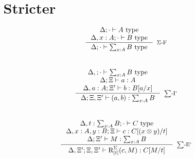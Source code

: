 \section*{Stricter}
\[
\begin{split}
\inference {\Delta ; \cdot \vdash A \text{ type}\\
  \Delta, x : A; \cdot \vdash B \text{ type}\\
  }
           {\Delta; \cdot \vdash \sum_{x: A}B \text{ type}
             }[$\Sigma$-F]
\end{split}
\]\\
\[
\begin{split}
  \inference {
    \Delta, ; \cdot \vdash \sum_{x : A}B \text{ type}\\
    \Delta; \Xi \vdash a : A\\
    \Delta, a : A ; \Xi' \vdash b : B[a/x]\\
}
           {\Delta; \Xi, \Xi' \vdash (a, b) : \sum_{x : A}B}[$\sum$-I']
\end{split}
\]\\
\[
\begin{split}
\inference {\Delta, t: \sum_{x : A}B; \cdot \vdash C \text{ type}\\
  \Delta, x: A, y: B; \Xi \vdash c : C[(x \otimes y)/t]\\
    \Delta; \Xi' \vdash M: \sum_{x : A}B\\
}
           {\Delta, \Xi'; \Xi, \Xi' \vdash \text{R}^{\Sigma}_{[t]}(c, M) : C[M/t]
           }[$\sum$-E']
\end{split}
\]
\newpage




